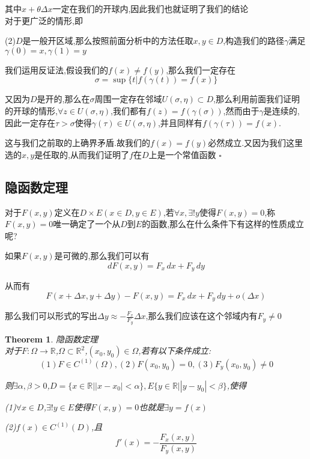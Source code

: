 \documentclass[11pt,hyperref,a4paper,UTF8]{ctexart}
\newtheorem{theorem}{Theorem}[subsection]
\newenvironment{cproof}{%
\heiti{证明}\kaishu
}{%
  \hfill $\square$
  \par\bigskip
}
\newcommand{\RR}{\mathbb{R}}
\begin{document}
\begin{CJK}{UTF8}{gkai}
\begin{cproof}
  其中$x + \theta \Delta x$一定在我们的开球内,因此我们也就证明了我们的结论\\

  对于更广泛的情形,即

  (2)$D$是一般开区域,那么按照前面分析中的方法任取$x,y \in D$,构造我们的路径$\gamma$满足$\gamma(0) = x, \gamma(1) = y$

  我们运用反证法,假设我们的$f(x) \neq f(y)$,那么我们一定存在
  \[\sigma = \sup\{t|f(\gamma(t)) = f(x)\}\]

  又因为$D$是开的,那么在$\sigma$周围一定存在邻域$U(\sigma,\eta) \subset D$,那么利用前面我们证明的开球的情形,$\forall z \in U(\sigma,\eta)$,我们都有$f(z) = f(\gamma(\sigma))$,然而由于$\gamma$是连续的,因此一定存在$\tau > \sigma$使得$\gamma(\tau) \in U(\sigma,\eta)$,并且同样有$f(\gamma(\tau)) = f(x)$.

  这与我们之前取的上确界矛盾.故我们的$f(x) = f(y)$必然成立.又因为我们这里选的$x,y$是任取的,从而我们证明了$f$在$D$上是一个常值函数
\end{cproof}

\subsection{隐函数定理}

对于$F(x,y)$定义在$D \times E(x \in D,y \in E)$,若$\forall x, \exists ! y$使得$F(x,y) = 0$,称$F(x,y) = 0$唯一确定了一个从$D$到$E$的函数,那么在什么条件下有这样的性质成立呢?

如果$F(x,y)$是可微的,那么我们可以有
\[d F(x,y) = F_x \,dx + F_y \, dy\]

从而有
\[F(x + \Delta x, y + \Delta y) - F(x,y) = F_x \,dx + F_y \, dy + o(\Delta x)\]

那么我们可以形式的写出$\Delta y \approx - \frac{F_x}{F_y} \Delta x$,那么我们应该在这个邻域内有$F_y \neq 0$

\begin{theorem}
  隐函数定理\\

  对于$F:\Omega \to \RR$,$\Omega \subset \RR^2$,$(x_0,y_0) \in \Omega$,若有以下条件成立:
  \[(1)F\in C^{(1)}(\Omega),(2)F(x_0,y_0) = 0,(3)F_y(x_0,y_0) \neq 0\]

  则$\exists \alpha,\beta > 0$,$D = \{x\in \RR| |x - x_0| < \alpha\},E \{y\in \RR||y - y_0 | < \beta \}$,使得

  (1)$\forall x \in D$,$\exists ! y \in E$使得$F(x,y) = 0$也就是$\exists y = f(x)$

  (2)$f(x) \in C^{(1)}(D)$,且
  \[f'(x) = -\frac{F_x(x,y)}{F_y(x,y)}\]
\end{theorem}


\end{CJK}
\end{document}

